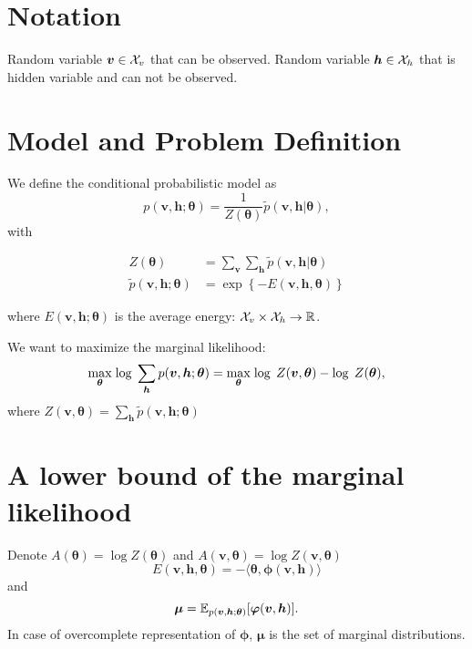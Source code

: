 \section{Notation}
Random variable $\bm{v} \in \mathcal{X}_v$ that can be observed.
Random variable $\bm{h} \in \mathcal{X}_h$ that is hidden variable and can not be observed.

\section{Model and Problem Definition}

We define the conditional probabilistic model as
\begin{equation}\label{eq:model}
  p(\bm{v}, \bm{h} ; \bm{\theta}) = \frac{1}{Z(\bm{\theta})} \tilde{p}(\bm{v}, \bm{h} |\bm{\theta}),
\end{equation}
with

\begin{align}
  Z(\bm{\theta}) & = \sum_{\bm{v}}\sum_{\bm{h}} \tilde{p}(\bm{v}, \bm{h} |\bm{\theta})\\
  \tilde{p}(\bm{v}, \bm{h} ; \bm{\theta}) & = \exp\left\{-E(\bm{v}, \bm{h}, \bm{\theta})\right\}
\end{align}

where $E(\bm{v}, \bm{h}; \bm{\theta})$ is the average energy: $\mathcal{X}_v \times \mathcal{X}_h \rightarrow \mathbb{R}$.

We want to maximize the marginal likelihood:
\begin{equation}
  \underset{\bm{\theta}}{\max}\;{\log\;\sum_{\bm{h}}p(\bm{v}, \bm{h}; \bm{\theta})} = \underset{\bm{\theta}}{\max}\;{\log\;Z(\bm{v}, \bm{\theta})} - \log\; Z(\bm{\theta}), 
\end{equation}
where $Z(\bm{v}, \bm{\theta})  = \sum_{\bm{h}}\tilde{p}(\bm{v}, \bm{h} ; \bm{\theta})$
\section{A lower bound of the marginal likelihood}
Denote $A(\bm{\theta}) = \log{Z(\bm{\theta})}$ and $A(\bm{v}, \bm{\theta}) = \log{Z(\bm{v}, \bm{\theta})}$
\begin{equation}
  E(\bm{v}, \bm{h}, \bm{\theta}) = - \langle  \bm{\theta}, \bm{\phi}(\bm{v}, \bm{h})\rangle
\end{equation}
and
\begin{equation}
  \bm{\mu} = \mathbb{E}_{p(\bm{v}, \bm{h}; \bm{\theta})}[\bm{\varphi}(\bm{v}, \bm{h})].
\end{equation}
In case of overcomplete representation of $\bm{\phi}$, $\bm{\mu}$ is the set of marginal distributions.


